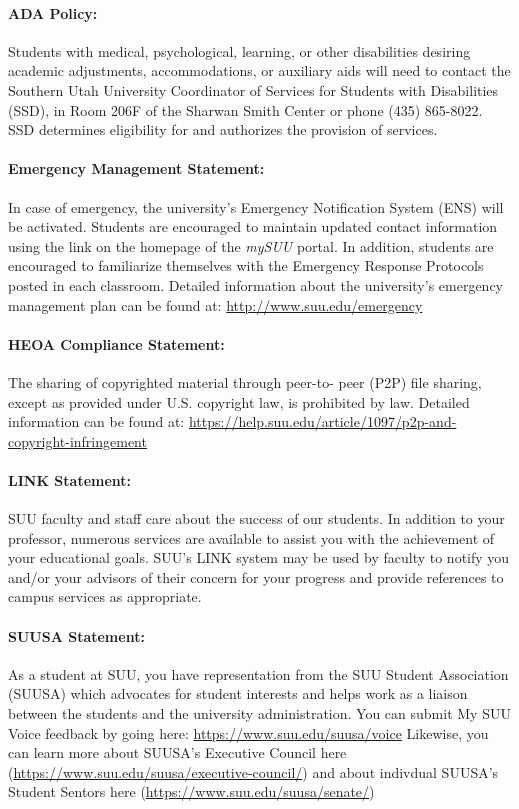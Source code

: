 \documentclass[12pt, letterpaper]{article}
\begin{document}
\paragraph{ADA Policy:}
Students with medical, psychological, learning, or other disabilities desiring academic adjustments, accommodations, or auxiliary aids will need to contact the Southern Utah University Coordinator of Services for Students with Disabilities (SSD), in Room 206F of the Sharwan Smith Center or phone (435) 865-8022. SSD determines eligibility for and authorizes the provision of services.

\paragraph{Emergency Management Statement:}
In case of emergency, the university's Emergency Notification System (ENS) will be activated. Students are encouraged to maintain updated contact information using the link on the homepage of the \emph{mySUU} portal. In addition, students are encouraged to familiarize themselves with the Emergency Response Protocols posted in each classroom. Detailed information about the university's emergency management plan can be found at: \href{http://www.suu.edu/emergency}{http://www.suu.edu/emergency}

\paragraph{HEOA Compliance Statement:}
The sharing of copyrighted material through peer-to- peer (P2P) file sharing, except as provided under U.S. copyright law, is prohibited by law. Detailed information can be found at: \href{https://help.suu.edu/article/1097/p2p-and-copyright-infringement}{https://help.suu.edu/article/1097/p2p-and-copyright-infringement}

\paragraph{LINK Statement:}
SUU faculty and staff care about the success of our students. In addition to your professor, numerous services are available to assist you with the achievement of your educational goals. SUU's LINK system may be used by faculty to notify you and/or your advisors of their concern for your progress and provide references to campus services as appropriate.

\paragraph{SUUSA Statement:}
As a student at SUU, you have representation from the SUU Student Association (SUUSA) which advocates for student interests and helps work as a liaison between the students and the university administration. You can submit My SUU Voice feedback by going here: \href{https://www.suu.edu/suusa/voice}{https://www.suu.edu/suusa/voice} Likewise, you can learn more about SUUSA's Executive Council here (\href{https://www.suu.edu/suusa/executive-council/}{https://www.suu.edu/suusa/executive-council/}) and about indivdual SUUSA's Student Sentors here (\href{https://www.suu.edu/suusa/senate/}{https://www.suu.edu/suusa/senate/})
\end{document}
